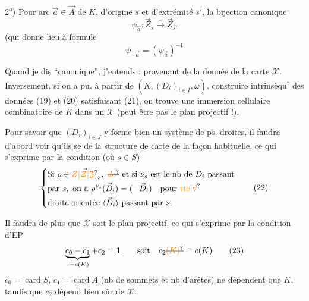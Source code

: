 2\textsuperscript{o}) Pour   arc $\vec a\in\vec A$ de $K$, d'origine
$s$ et d'extrémité $s'$, la bijection canonique
\[\psi_{\vec a}:\vec Z_s\xrightarrow{\sim}\vec Z_{s'}\tag*{(20)}\]
(qui donne lieu à  formule
\[\psi_{-\vec a}=(\psi_{\vec a})^{-1}\tag*{(21)}\]

Quand je dis ``canonique'', j'entends :
provenant de la donnée de la carte $\mathcal X$.
Inversement, si on a pu, à partir de $(K,(D_i)_{i\in I},\omega)$,
construire intrinsèqu\textsuperscript{t} des données
(19) et (20) satisfaisant (21), on trouve une
immersion cellulaire combinatoire de
$K$ dans un $\mathcal X$ (peut être pas le plan projectif !).

Pour savoir que $(D_i)_{i\in J}$ y forme bien un
système de ps. droites, il faudra d'abord voir
qu'ils se  de la structure de carte
de la façon habituelle, ce qui s'exprime
par la condition (où $s\in S$)
\[\left\{\begin{aligned}
&\text{Si }\rho\in\vec{\unsure{Z|\mathcal Z|\mathfrak Z}}_s,\ \deleted{\unsure{de}}\ \text{et si }{\nu}_s\text{ est le nb de }D_i\text{ passant}\\
&\text{par }s,\ \text{on a }\rho^{\nu_s}(\vec D_i)=(-\vec D_i)\quad\text{pour }\unsure{\text{tte}|\forall}\\
&\text{droite orientée }\inserted{\vec D_i}\text{ passant par }s.
\end{aligned}\right.\tag*{(22)}\]

Il faudra de plus que $\mathcal X$ soit le plan projectif,
ce qui s'exprime par la condition d'EP
\[\underbrace{c_0-c_1}_{1-c(K)}+c_2=1\qquad\text{soit}\quad c_2\deleted{\unsure{(K)}}=c(K)\tag*{(23)}\]
$c_0=\operatorname{card} S$, $c_1=\operatorname{card} A$ (nb de sommets et
nb d'arêtes) ne dépendent que $K$, tandis que
$c_2$  dépend bien sûr de $\mathcal X$.

